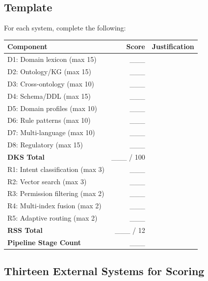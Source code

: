 \documentclass[10pt,a4paper]{article}
\begin{document}
\subsection{Template}

For each system, complete the following:

\begin{center}
\footnotesize
\begin{tabular}{@{}lrl@{}}
\toprule
\textbf{Component} & \textbf{Score} & \textbf{Justification} \\
\midrule
D1: Domain lexicon (max 15) & \_\_\_ & \\
D2: Ontology/KG (max 15) & \_\_\_ & \\
D3: Cross-ontology (max 10) & \_\_\_ & \\
D4: Schema/DDL (max 15) & \_\_\_ & \\
D5: Domain profiles (max 10) & \_\_\_ & \\
D6: Rule patterns (max 10) & \_\_\_ & \\
D7: Multi-language (max 10) & \_\_\_ & \\
D8: Regulatory (max 15) & \_\_\_ & \\
\midrule
\textbf{DKS Total} & \_\_\_ / 100 & \\
\midrule
R1: Intent classification (max 3) & \_\_\_ & \\
R2: Vector search (max 3) & \_\_\_ & \\
R3: Permission filtering (max 2) & \_\_\_ & \\
R4: Multi-index fusion (max 2) & \_\_\_ & \\
R5: Adaptive routing (max 2) & \_\_\_ & \\
\midrule
\textbf{RSS Total} & \_\_\_ / 12 & \\
\midrule
\textbf{Pipeline Stage Count} & \_\_\_ & \\
\bottomrule
\end{tabular}
\end{center}

\subsection{Thirteen External Systems for Scoring}
\end{document}
